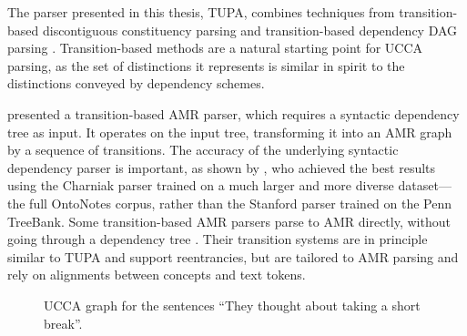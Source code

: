 \documentclass[12pt,a4paper,table]{report}
\renewcommand\cite{\citep}      %
\newcommand\newcite{\citet}     %
\begin{document}
The parser presented in this thesis, TUPA, combines techniques from transition-based discontiguous constituency parsing \cite{maier2015discontinuous}
and transition-based dependency DAG parsing \cite{tokgoz2015transition}.
Transition-based methods are a natural starting point for UCCA parsing,
as the set of distinctions it represents is similar in spirit to the distinctions
conveyed by dependency schemes.

\citet{wang2015transition,wang-xue-pradhan:2015:ACL-IJCNLP,wang-EtAl:2016:SemEval,goodman2016noise,wang2017getting}
presented a transition-based AMR parser, which requires a
syntactic dependency tree as input.
It operates on the input tree, transforming it into an AMR graph
by a sequence of transitions.
The accuracy of the underlying syntactic dependency parser is important,
as shown by \newcite{wang-xue-pradhan:2015:ACL-IJCNLP},
who achieved the best results using the Charniak parser trained on a
much larger and more diverse dataset---the full OntoNotes corpus,
rather than the Stanford parser trained on the Penn TreeBank.
Some transition-based AMR parsers parse to AMR directly,
without going through a dependency tree
\citep{zhou2016amr,D17-1130,damonte-17,N18-1104}.
Their transition systems are in principle similar to TUPA and support reentrancies,
but are tailored to AMR parsing and rely on alignments between concepts and text tokens.

\begin{figure}\centering
{}
\caption{UCCA graph for the sentences
``They thought about taking a short break''.}\label{fig:theythoughtabouttakingashortbreak}
\end{figure}
\end{document}
